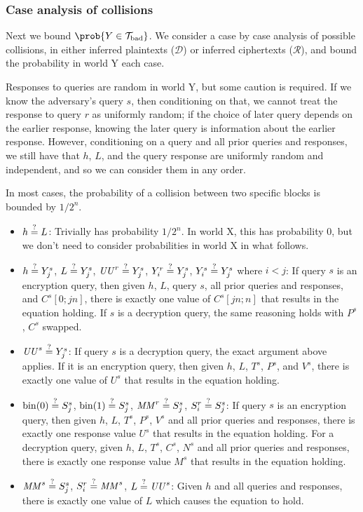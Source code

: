 \documentclass[hctr.tex]{subfiles}
\begin{document}
\subsubsection{Case analysis of collisions}
Next we bound \(\prob{Y \in \Tb}\).
We consider a case by case analysis of possible collisions,
in either inferred plaintexts (\(\mathcal{D}\))
or inferred ciphertexts (\(\mathcal{R}\)),
and bound the probability in world Y each case.

Responses to queries are random in world Y,
but some caution is required.
If we know the adversary's query \(s\), then conditioning on that,
we cannot treat the response to query \(r\) as uniformly random;
if the choice of later query depends on the earlier response,
knowing the later query is information about the earlier response.
However, conditioning on a query and all prior queries and responses,
we still have that \(h\), \(L\), and the
query response are uniformly random and independent,
and so we can consider them in any order.


In most cases, the probability of a collision
between two specific blocks is bounded by \(1/2^n\).

\begin{itemize}
    \item \(h \stackrel{\text{?}}{=} L\):
    Trivially has probability \(1/2^n\).
    In world X, this has probability 0,
    but we don't need to consider probabilities in world X
    in what follows.
    \item
    \(h \stackrel{\text{?}}{=} Y_j^s\),
    \(L \stackrel{\text{?}}{=} Y_j^s\),
    \(\mathit{UU}^r \stackrel{\text{?}}{=} Y_j^s\),
    \(Y_i^r \stackrel{\text{?}}{=} Y_j^s\),
    \(Y_i^s \stackrel{\text{?}}{=} Y_j^s\) where \(i < j\): 
    If query \(s\) is an encryption query,
    then given \(h\), \(L\), query \(s\), 
    all prior queries and responses, and
    \(C^s[0;jn]\), there is exactly one value of
    \(C^s[jn;n]\) that results in the equation holding.
    If \(s\) is a decryption query, the same reasoning holds
    with \(P^s\), \(C^s\) swapped.
    \item 
    \(\mathit{UU}^s \stackrel{\text{?}}{=} Y_j^s\):
    If query \(s\) is a decryption query,
    the exact argument above applies.
    If it is an encryption query,
    then given \(h\), \(L\), \(T^s\), \(P^s\),
    and \(V^s\), there is exactly
    one value of \(U^s\) that results
    in the equation holding.
    \item 
    \(\operatorname{bin}(0) \stackrel{\text{?}}{=} S_j^s\),
    \(\operatorname{bin}(1) \stackrel{\text{?}}{=} S_j^s\),
    \(\mathit{MM}^r \stackrel{\text{?}}{=} S_j^s\),
    \(S_i^r \stackrel{\text{?}}{=} S_j^s\):
    If query \(s\) is an encryption query,
    then given \(h\), \(L\), \(T^s\),
    \(P^s\), \(V^s\)
    and all prior queries and responses,
    there is exactly one response value \(U^s\)
    that results in the equation holding.
    For a decryption query, 
    given \(h\), \(L\), \(T^s\),
    \(C^s\), \(N^s\)
    and all prior queries and responses,
    there is exactly one response value \(M^s\)
    that results in the equation holding.
    \item
    \(\mathit{MM}^s \stackrel{\text{?}}{=} S_j^s\),
    \(S_i^r \stackrel{\text{?}}{=} \mathit{MM}^s\),
    \(L \stackrel{\text{?}}{=} \mathit{UU}^s\):
    Given \(h\) and all queries and responses,
    there is exactly one value of \(L\)
    which causes the equation to hold.
\end{itemize}
\end{document}
